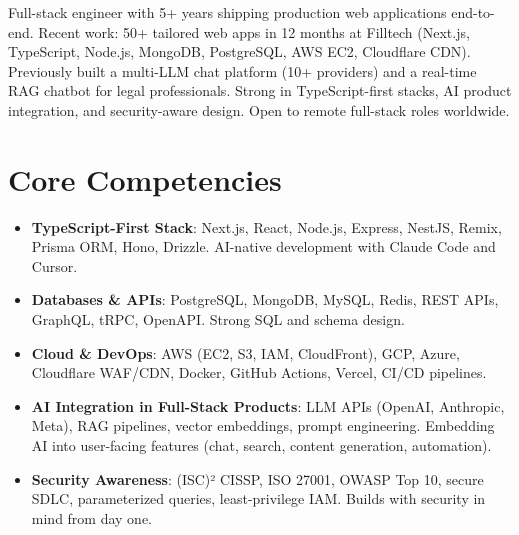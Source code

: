 \documentclass[11pt,a4paper,sans]{moderncv}
\begin{document}
\makecvtitle


\vspace{6pt}
\small{Full-stack engineer with 5+ years shipping production web applications end-to-end. Recent work: 50+ tailored web apps in 12 months at Filltech (Next.js, TypeScript, Node.js, MongoDB, PostgreSQL, AWS EC2, Cloudflare CDN). Previously built a multi-LLM chat platform (10+ providers) and a real-time RAG chatbot for legal professionals. Strong in TypeScript-first stacks, AI product integration, and security-aware design. Open to remote full-stack roles worldwide.}


\section{Core Competencies}
\vspace{1pt}
\begin{itemize}

\item \textbf{TypeScript-First Stack}: Next.js, React, Node.js, Express, NestJS, Remix, Prisma ORM, Hono, Drizzle. AI-native development with Claude Code and Cursor.

\item \textbf{Databases \& APIs}: PostgreSQL, MongoDB, MySQL, Redis, REST APIs, GraphQL, tRPC, OpenAPI. Strong SQL and schema design.

\item \textbf{Cloud \& DevOps}: AWS (EC2, S3, IAM, CloudFront), GCP, Azure, Cloudflare WAF/CDN, Docker, GitHub Actions, Vercel, CI/CD pipelines.

\item \textbf{AI Integration in Full-Stack Products}: LLM APIs (OpenAI, Anthropic, Meta), RAG pipelines, vector embeddings, prompt engineering. Embedding AI into user-facing features (chat, search, content generation, automation).

\item \textbf{Security Awareness}: (ISC)² CISSP, ISO 27001, OWASP Top 10, secure SDLC, parameterized queries, least-privilege IAM. Builds with security in mind from day one.

\end{itemize}
\end{document}
